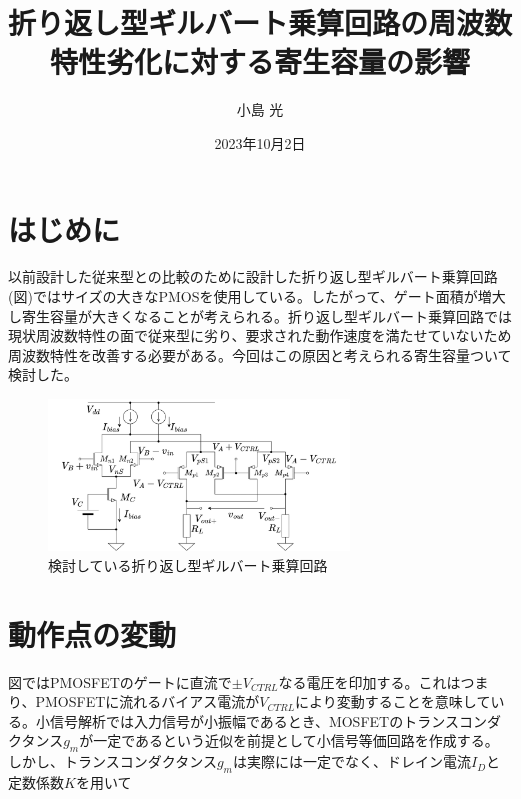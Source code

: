 \documentclass[twocolumn]{jsarticle}
\begin{document}
\title{折り返し型ギルバート乗算回路の周波数特性劣化に対する寄生容量の影響}
\author{小島 光}
\date{2023年10月2日}
\maketitle

\section{はじめに}
以前設計した従来型との比較のために設計した折り返し型ギルバート乗算回路(図)ではサイズの大きなPMOSを使用している。したがって、ゲート面積が増大し寄生容量が大きくなることが考えられる。折り返し型ギルバート乗算回路では現状周波数特性の面で従来型に劣り、要求された動作速度を満たせていないため周波数特性を改善する必要がある。今回はこの原因と考えられる寄生容量ついて検討した。

\begin{figure}[h]
    \begin{center}
        \includegraphics*[width=80mm]{figures/folded_gilbert.png}
        \caption{検討している折り返し型ギルバート乗算回路}
        \label{fig:folded_gilbert}
    \end{center}
\end{figure}

\section{動作点の変動}

図ではPMOSFETのゲートに直流で$\pm V_{CTRL}$なる電圧を印加する。これはつまり、PMOSFETに流れるバイアス電流が$V_{CTRL}$により変動することを意味している。小信号解析では入力信号が小振幅であるとき、MOSFETのトランスコンダクタンス$g_{m}$が一定であるという近似を前提として小信号等価回路を作成する。しかし、トランスコンダクタンス$g_{m}$は実際には一定でなく、ドレイン電流$I_{D}$と定数係数$K$を用いて
\end{document}
